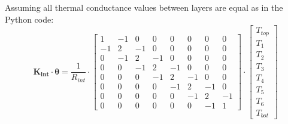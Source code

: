 \begin{scriptsize}
	Assuming all thermal conductance values between layers are equal as in the Python code:
	\begin{equation}
		\mathbf{K_{int}} \cdot \boldsymbol{\theta} = \frac{1}{R_{int}} \cdot
		\begin{bmatrix}
			1 & -1 & 0 & 0 & 0 & 0 & 0 & 0 \\
			-1 & 2 & -1 & 0 & 0 & 0 & 0 & 0 \\
			0 & -1 & 2 & -1 & 0 & 0 & 0 & 0\\
			0 & 0  & -1 & 2 & -1 & 0 & 0 & 0 \\
			0 & 0 & 0 & -1 &  2 & -1 & 0 & 0 \\
			0 & 0 & 0 & 0 & -1 &  2 & -1 & 0 \\
			0 & 0 & 0 & 0 & 0 & -1 &  2 & -1 \\
			0 & 0 & 0 & 0 & 0 & 0 & -1 & 1
		\end{bmatrix}
		\cdot
		\begin{bmatrix}
			T_{top} \\
			T_{1} \\
			T_{2} \\
			T_{3} \\
			T_{4} \\
			T_{5} \\
			T_{6} \\
			T_{bot}
		\end{bmatrix}
	\end{equation}
	
	\begin{comment}
		General matrix for $\mathbf{K_{ext}}$:
		\begin{equation}
			\mathbf{K_{ext}} \cdot \boldsymbol{\theta} =
			\begin{bmatrix}
				\frac{1}{R_{top, amb}} & 0 & 0 & 0 & 0 & 0 & 0 & 0 \\
				0 &  \frac{1}{R_{1, amb}} & 0 & 0 & 0 & 0 & 0 & 0 \\
				0 & 0 &  \frac{1}{R_{2, amb}} & 0 & 0 & 0 & 0 & 0 \\
				0 & 0  & 0 &  \frac{1}{R_{3, amb}} & 0 & 0 & 0 & 0 \\
				0 & 0 & 0 & 0 &  \frac{1}{R_{4, amb}} & 0 & 0 & 0 \\
				0 & 0 & 0 & 0 & 0 &  \frac{1}{R_{5, amb}} & 0 & 0 \\
				0 & 0 & 0 & 0 & 0 & 0 &  \frac{1}{R_{6, amb}} & 0 \\
				0 & 0 & 0 & 0 & 0 & 0 & 0 & \frac{1}{R_{bot,amb}}
			\end{bmatrix}
			\cdot
			\begin{bmatrix}
				T_{top} \\
				T_{1} \\
				T_{2} \\
				T_{3} \\
				T_{4} \\
				T_{5} \\
				T_{6} \\
				T_{bot}
			\end{bmatrix}
		\end{equation}
	\end{comment}
	

\end{scriptsize}
